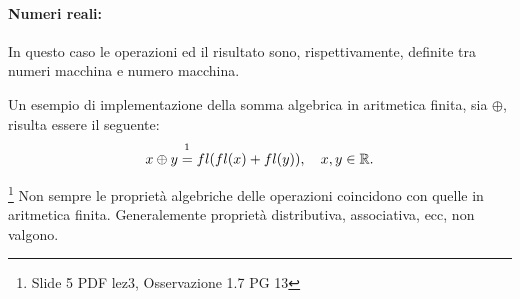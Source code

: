 \paragraph{Numeri reali:} In questo caso le operazioni ed il risultato sono, rispettivamente, definite tra numeri macchina e numero macchina.

Un esempio di implementazione della somma algebrica in aritmetica finita, sia $\oplus$, risulta essere il seguente:
\begin{equation*}
	x\oplus y\overset{\footnotemark}{=}fl(fl(x)+fl(y)),\quad x,y\in\mathbb R.
\end{equation*}

\begin{remark}\footnote{Slide 5 PDF lez3, Osservazione 1.7 PG 13}
	Non sempre le proprietà algebriche delle operazioni coincidono con quelle in aritmetica finita. Generalemente proprietà distributiva, associativa, ecc, non valgono.
\end{remark}


